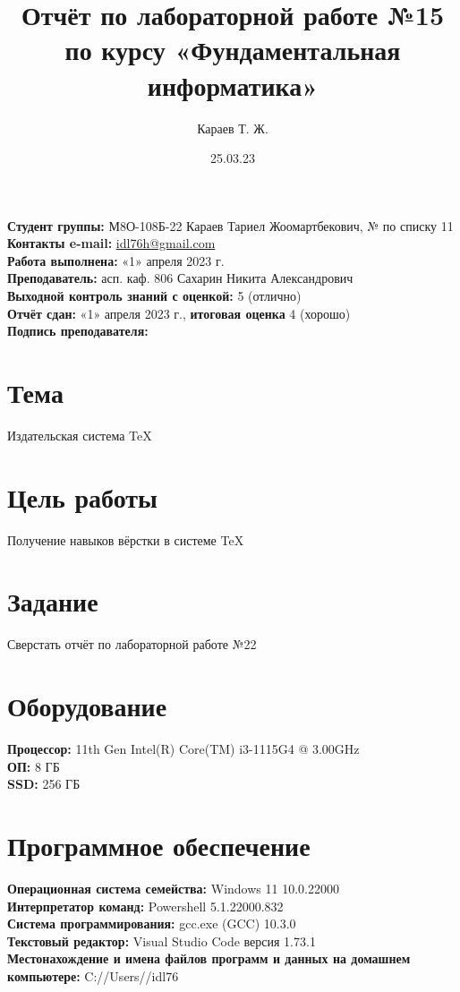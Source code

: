 \documentclass{article}
\title{Отчёт по лабораторной работе №15 по курсу «Фундаментальная информатика»}
\author{Караев Т. Ж.}
\date{25.03.23}
\begin{document}
\maketitle

\noindent
\textbf{Студент группы:} М8О-108Б-22 Караев Тариел Жоомартбекович, № по списку 11 \\
\textbf{Контакты e-mail:} \underline{idl76h@gmail.com} \\
\textbf{Работа выполнена:} «1» апреля 2023 г. \\
\textbf{Преподаватель:} асп. каф. 806 Сахарин Никита Александрович \\
\textbf{Выходной контроль знаний с оценкой:}  5 (отлично) \\
\textbf{Отчёт сдан:} «1» апреля 2023 г., \textbf{итоговая оценка} 4 (хорошо)\\
\textbf{Подпись преподавателя:} \\

\section{Тема}
Издательская система TeX

\section{Цель работы}
Получение навыков вёрстки в системе TeX

\section{Задание}
Сверстать отчёт по лабораторной работе №22

\section{Оборудование}
\textbf{Процессор:} 11th Gen Intel(R) Core(TM) i3-1115G4 @ 3.00GHz \\
\textbf{ОП:} 8 ГБ \\
\textbf{SSD:} 256 ГБ \\

\section{Программное обеспечение}
\textbf{Операционная система семейства:} Windows 11 10.0.22000 \\
\textbf{Интерпретатор команд:} Powershell 5.1.22000.832 \\
\textbf{Система программирования:} gcc.exe (GCC) 10.3.0 \\
\textbf{Текстовый редактор:} Visual Studio Code версия 1.73.1 \\
\textbf{Местонахождение и имена файлов программ и данных на домашнем компьютере:} C://Users//idl76 \\
\end{document}

